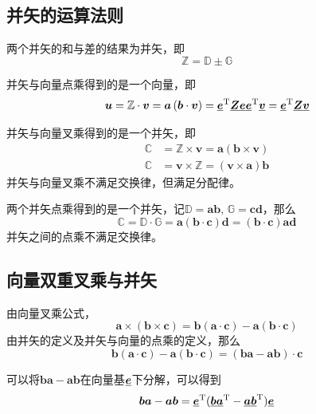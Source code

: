 \subsection{并矢的运算法则}
\sssection[并矢的线性运算]

两个并矢的和与差的结果为并矢，即
\begin{equation}
    \mathbb{Z} = \mathbb{D} \pm \mathbb{G}    
\end{equation}
\vspace*{0.1em}

\sssection[并矢与向量点乘]

并矢与向量点乘得到的是一个向量，即
\begin{equation}
    \bm{u} = \mathbb{Z} \cdot \bm{v} = \bm{a}\left(\bm{b} \cdot \bm{v}\right) = \underline{\bm{e}}^{\text{T}} \underline{\bm{Z}} \underline{\bm{e}} \underline{\bm{e}}^{\text{T}} \underline{\bm{v}} = \underline{\bm{e}}^{\text{T}} \underline{\bm{Z}} \underline{\bm{v}}
\end{equation}
\vspace*{0.1em}

\sssection[并矢与向量叉乘]

并矢与向量叉乘得到的是一个并矢，即
\begin{align}
    \mathbb{C} &= \mathbb{Z} \times \bm{v} = \bm{a}(\bm{b} \times \bm{v}) \\
    \mathbb{C} &= \bm{v} \times \mathbb{Z} = (\bm{v} \times \bm{a})\bm{b} 
\end{align}
并矢与向量叉乘不满足交换律，但满足分配律。
\vspace*{1em}

\sssection[并矢的并矢的点乘]

两个并矢点乘得到的是一个并矢，记$\mathbb{D} = \bm{a}\bm{b}, \, \mathbb{G} = \bm{c}\bm{d}$，那么
\begin{equation}
    \mathbb{C} = \mathbb{D} \cdot \mathbb{G} = \bm{a} (\bm{b} \cdot \bm{c}) \bm{d} = (\bm{b} \cdot \bm{c})\bm{a}\bm{d}
\end{equation}
并矢之间的点乘不满足交换律。
\vspace*{1em}


\subsection{向量双重叉乘与并矢}
由向量叉乘公式，
\begin{equation}
    \bm{a} \times (\bm{b} \times \bm{c}) = \bm{b}(\bm{a}\cdot\bm{c}) - \bm{a}(\bm{b} \cdot \bm{c})
\end{equation}
由并矢的定义及并矢与向量的点乘的定义，那么
\begin{equation}
    \bm{b}(\bm{a} \cdot \bm{c}) - \bm{a}(\bm{b} \cdot \bm{c}) = (\bm{b}\bm{a} - \bm{a}\bm{b})\cdot \bm{c}
\end{equation}

可以将$\bm{b}\bm{a} - \bm{a}\bm{b}$在向量基$\underline{\bm{e}}$下分解，可以得到
\begin{equation*}
    \bm{b}\bm{a} - \bm{a}\bm{b} = \underline{\bm{e}}^{\text{T}} (\underline{\bm{b}}\underline{\bm{a}}^{\text{T}} - \underline{\bm{a}}\underline{\bm{b}}^{\text{T}})\underline{\bm{e}}
\end{equation*}






















